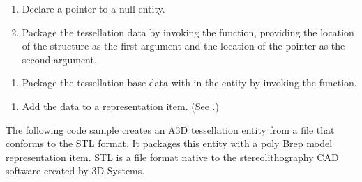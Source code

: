 \documentclass[letterpaper,12pt,english,openany,oneside]{sphinxmanual}
\begin{document}
\begin{enumerate}
\item {} 
Declare a pointer to a null  entity.

\item {} 
Package the tessellation data by invoking the  function, providing the location of the  structure as the first argument and the location of the  pointer as the second argument.

\end{enumerate}

\begin{sphinxVerbatim}[commandchars=\\\{\}]
   
 
\end{sphinxVerbatim}
\begin{enumerate}
%
\setcounter{enumi}{7}
\item {} 
Package the tessellation base data with in the  entity by invoking the  function.

\end{enumerate}

\begin{sphinxVerbatim}[commandchars=\\\{\}]
 
\end{sphinxVerbatim}
\begin{enumerate}
%
\setcounter{enumi}{8}
\item {} 
Add the  data to a representation item. (See .)

\end{enumerate}

The following code sample creates an A3D tessellation entity from a file that conforms to the STL format. It packages this entity with a poly Brep model representation item. STL is a file format native to the stereolithography CAD software created by 3D Systems.
\end{document}
